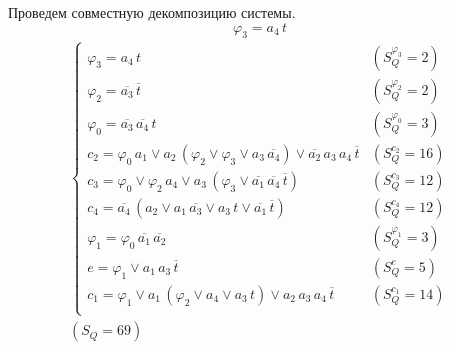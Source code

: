 \documentclass{article}
\begin{document}
\noindent\begin{minipage}{\textwidth}
Проведем совместную декомпозицию системы. \[\varphi_{3} = a_4\,t\]
\[\begin{matrix}
    \begin{cases}
        \varphi_{3} = a_4\,t & (S_Q^{\varphi_{3}} = 2) \\
        \varphi_{2} = \overline{a_3}\,\overline{t} & (S_Q^{\varphi_{2}} = 2) \\
        \varphi_{0} = \overline{a_3}\,\overline{a_4}\,t & (S_Q^{\varphi_{0}} = 3) \\
        c_2 = \varphi_{0}\,a_1 \lor a_2\,\left(\varphi_{2} \lor \varphi_{3} \lor a_3\,\overline{a_4}\right) \lor \overline{a_2}\,a_3\,a_4\,\overline{t} & (S_Q^{c_2} = 16) \\
        c_3 = \varphi_{0} \lor \varphi_{2}\,a_4 \lor a_3\,\left(\varphi_{3} \lor \overline{a_1}\,\overline{a_4}\,\overline{t}\right) & (S_Q^{c_3} = 12) \\
        c_4 = \overline{a_4}\,\left(a_2 \lor a_1\,\overline{a_3} \lor a_3\,t \lor \overline{a_1}\,\overline{t}\right) & (S_Q^{c_4} = 12) \\
        \varphi_{1} = \varphi_{0}\,\overline{a_1}\,\overline{a_2} & (S_Q^{\varphi_{1}} = 3) \\
        e = \varphi_{1} \lor a_1\,a_3\,\overline{t} & (S_Q^{e} = 5) \\
        c_1 = \varphi_{1} \lor a_1\,\left(\varphi_{2} \lor a_4 \lor a_3\,t\right) \lor a_2\,a_3\,a_4\,\overline{t} & (S_Q^{c_1} = 14) \\
    \end{cases} \\ (S_Q = 69)
\end{matrix}\] \\ \phantom{0}
\end{minipage}
\end{document}
